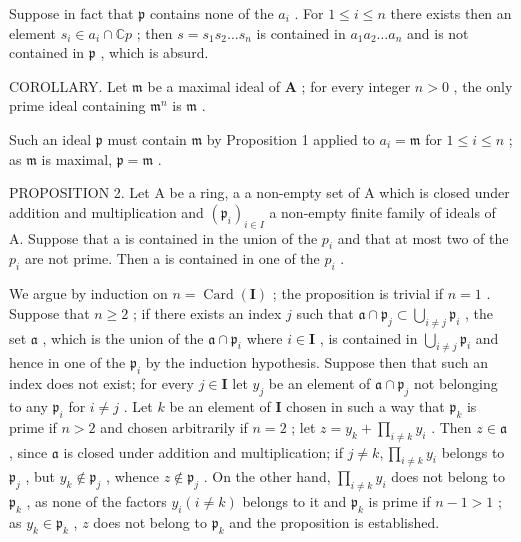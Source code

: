 Suppose in fact that \(\mathfrak{p}\) contains none of the \(a_{i}\) . For \(1 \leqslant i \leqslant n\) there exists then an element \(s_{i} \in a_{i} \cap \mathbb{C}p\) ; then \(s = s_{1}s_{2} \ldots s_{n}\) is contained in \(a_{1}a_{2} \ldots a_{n}\) and is not contained in \(\mathfrak{p}\) , which is absurd.

COROLLARY. Let \(\mathfrak{m}\) be a maximal ideal of \(\mathbf{A}\) ; for every integer \(n > 0\) , the only prime ideal containing \(\mathfrak{m}^n\) is \(\mathfrak{m}\) .

Such an ideal \(\mathfrak{p}\) must contain \(\mathfrak{m}\) by Proposition 1 applied to \(a_{i} = \mathfrak{m}\) for \(1 \leqslant i \leqslant n\) ; as \(\mathfrak{m}\) is maximal, \(\mathfrak{p} = \mathfrak{m}\) .

PROPOSITION 2. Let A be a ring, a a non-empty set of A which is closed under addition and multiplication and \((\mathfrak{p}_{i})_{i\in I}\) a non-empty finite family of ideals of A. Suppose that a is contained in the union of the \(p_{i}\) and that at most two of the \(p_{i}\) are not prime. Then a is contained in one of the \(p_{i}\) .

We argue by induction on \(n = \operatorname{Card}(\mathbf{I})\) ; the proposition is trivial if \(n = 1\) . Suppose that \(n \geqslant 2\) ; if there exists an index \(j\) such that \(\mathfrak{a} \cap \mathfrak{p}_j \subset \bigcup_{i \neq j} \mathfrak{p}_i\) , the set \(\mathfrak{a}\) , which is the union of the \(\mathfrak{a} \cap \mathfrak{p}_i\) where \(i \in \mathbf{I}\) , is contained in \(\bigcup_{i \neq j} \mathfrak{p}_i\) and hence in one of the \(\mathfrak{p}_i\) by the induction hypothesis. Suppose then that such an index does not exist; for every \(j \in \mathbf{I}\) let \(y_j\) be an element of \(\mathfrak{a} \cap \mathfrak{p}_j\) not belonging to any \(\mathfrak{p}_i\) for \(i \neq j\) . Let \(k\) be an element of \(\mathbf{I}\) chosen in such a way that \(\mathfrak{p}_k\) is prime if \(n > 2\) and chosen arbitrarily if \(n = 2\) ; let \(z = y_k + \prod_{i \neq k} y_i\) . Then \(z \in \mathfrak{a}\) , since \(\mathfrak{a}\) is closed under addition and multiplication; if \(j \neq k, \prod_{i \neq k} y_i\) belongs to \(\mathfrak{p}_j\) , but \(y_k \notin \mathfrak{p}_j\) , whence \(z \notin \mathfrak{p}_j\) . On the other hand, \(\prod_{i \neq k} y_i\) does not belong to \(\mathfrak{p}_k\) , as none of the factors \(y_i (i \neq k)\) belongs to it and \(\mathfrak{p}_k\) is prime if \(n - 1 > 1\) ; as \(y_k \in \mathfrak{p}_k\) , \(z\) does not belong to \(\mathfrak{p}_k\) and the proposition is established.

